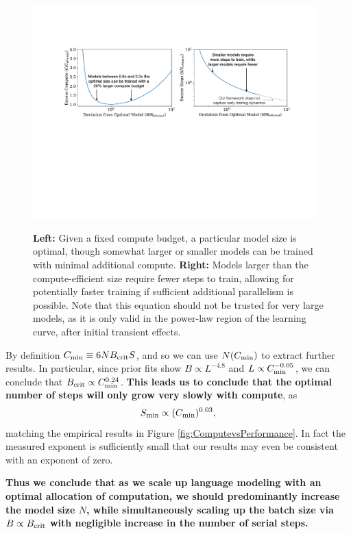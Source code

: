 \documentclass[english]{article}
\newcommand{\be}{\begin{equation}}
\newcommand{\ee}{\end{equation}}
\begin{document}
\begin{figure}
\noindent \centering{}
\includegraphics[width=0.98\textwidth]{SuboptimalModels}\
\caption[Training on suboptimal models]{\textbf{Left:} Given a fixed compute budget, a particular model size is optimal, though somewhat larger or smaller models can be trained with minimal additional compute. \textbf{Right:} Models larger than the compute-efficient size require fewer steps to train, allowing for potentially faster training if sufficient additional parallelism is possible. Note that this equation should not be trusted for very large models, as it is only valid in the power-law region of the learning curve, after initial transient effects.  \label{fig:SubOptimalModels}}
\end{figure}

By definition $C_{\rm min} \equiv 6 N B_{\rm crit} S$, and so we can use $N(C_{\rm min})$ to extract further results.  In particular, since prior fits show $B \propto L^{-4.8}$ and $L \propto C_{\rm min}^{-0.05}$, we can conclude that $B_{\rm crit} \propto C_{\rm min}^{0.24}$.  \textbf{This leads us to conclude that the optimal number of steps will only grow very slowly with compute}, as
\be
S_{\rm min} \propto (C_{\rm min})^{0.03},
\ee
matching the empirical results in Figure \ref{fig:ComputevsPerformance}.  In fact the measured exponent is sufficiently small that our results may even be consistent with an exponent of zero.  

\textbf{Thus we conclude that as we scale up language modeling with an optimal allocation of computation, we should predominantly increase the model size $N$, while simultaneously scaling up the batch size  via $B \propto B_{\rm crit}$ with negligible increase in the number of serial steps.}
\end{document}
